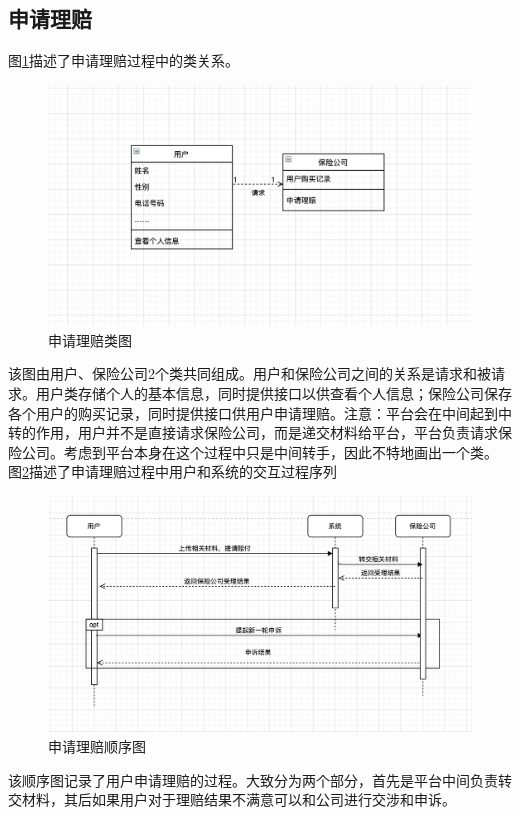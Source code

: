 \documentclass[a4paper]{ctexart}
\begin{document}
\subsection{申请理赔}
图\ref{fig:申请理赔类图}描述了申请理赔过程中的类关系。
\begin{figure}[H]
\centering
\includegraphics[scale=0.3]{image/1_6类图.png}
\caption{申请理赔类图}
\label{fig:申请理赔类图}
\end{figure}
该图由用户、保险公司2个类共同组成。用户和保险公司之间的关系是请求和被请求。用户类存储个人的基本信息，同时提供接口以供查看个人信息；保险公司保存各个用户的购买记录，同时提供接口供用户申请理赔。注意：平台会在中间起到中转的作用，用户并不是直接请求保险公司，而是递交材料给平台，平台负责请求保险公司。考虑到平台本身在这个过程中只是中间转手，因此不特地画出一个类。 \\

图\ref{fig:申请理赔顺序图}描述了申请理赔过程中用户和系统的交互过程序列
\begin{figure}[H]
\centering
\includegraphics[scale=0.5]{image/1_2顺序图.png}
\caption{申请理赔顺序图}
\label{fig:申请理赔顺序图}
\end{figure}
该顺序图记录了用户申请理赔的过程。大致分为两个部分，首先是平台中间负责转交材料，其后如果用户对于理赔结果不满意可以和公司进行交涉和申诉。\\
\end{document}

